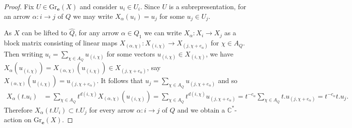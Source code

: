 \documentclass{amsart}
\numberwithin{equation}{section}
\newcommand{\CC}{\mathbb{C}}
\newcommand{\bfe}{\mathbf{e}}
\newcommand{\Gr}{\mathrm{Gr}}
\begin{document}
\begin{proof} 
  Fix $U\in\Gr_\bfe(X)$ and consider $u_i\in U_i$.
  Since $U$ is a subrepresentation, for an arrow $\alpha:i\to j$ of $Q$ we may write $X_\alpha(u_i)=u_j$ for some $u_j\in U_j$.

  As $X$ can be lifted to $\hat Q$, for any arrow $\alpha\in Q_1$ we can write $X_\alpha:X_i\to X_j$ as a block matrix consisting of linear maps $X_{(\alpha,\chi)}:X_{(i,\chi)}\to X_{(j,\chi+e_\alpha)}$ for $\chi\in A_Q$.
  Then writing $u_i=\sum_{\chi\in A_Q} u_{(i,\chi)}$ for some vectors $u_{(i,\chi)}\in X_{(i,\chi)}$, we have $X_\alpha(u_{(i,\chi)})=X_{(\alpha,\chi)}(u_{(i,\chi)})\in X_{(j,\chi+e_\alpha)}$, say $X_{(\alpha,\chi)}(u_{(i,\chi)})=u_{(j,\chi+e_\alpha)}$.
  It follows that $u_j=\sum_{\chi\in A_Q} u_{(j,\chi+e_\alpha)}$ and so
  \begin{align*}
    X_\alpha(t.u_i)
    &=\sum\limits_{\chi\in A_Q} t^{d(i,\chi)}X_{(\alpha,\chi)}(u_{(i,\chi)})=\sum\limits_{\chi\in A_Q} t^{d(i,\chi)}u_{(j,\chi+e_\alpha)}=t^{-c_\alpha}\sum\limits_{\chi\in A_Q} t.u_{(j,\chi+e_\alpha)}=t^{-c_\alpha} t.u_j.
  \end{align*}
  Therefore $X_\alpha(t.U_i)\subset t.U_j$ for every arrow $\alpha:i\to j$ of $Q$ and we obtain a $\CC^*$-action on $\Gr_\bfe(X)$.
\end{proof}
\end{document}
